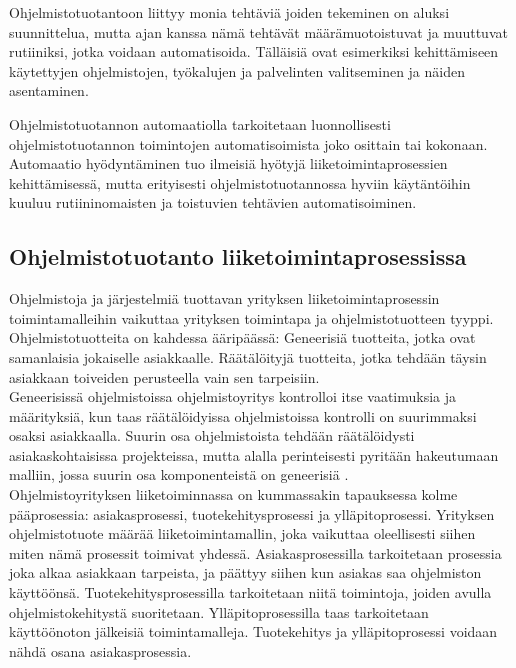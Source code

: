 \documentclass[finnish,12pt,a4paper,pdftex]{article}
\begin{document}
Ohjelmistotuotantoon liittyy monia tehtäviä joiden tekeminen on aluksi suunnittelua, mutta ajan kanssa nämä tehtävät määrämuotoistuvat ja muuttuvat rutiiniksi, jotka voidaan automatisoida. Tälläisiä ovat esimerkiksi kehittämiseen käytettyjen ohjelmistojen, työkalujen ja palvelinten valitseminen ja näiden asentaminen. \citep{kallio}

Ohjelmistotuotannon automaatiolla tarkoitetaan luonnollisesti ohjelmistotuotannon toimintojen automatisoimista joko osittain tai kokonaan. Automaatio hyödyntäminen tuo ilmeisiä hyötyjä liiketoimintaprosessien kehittämisessä, mutta erityisesti ohjelmistotuotannossa hyviin käytäntöihin kuuluu rutiininomaisten ja toistuvien tehtävien automatisoiminen. \citep{leanit}


\subsection{Ohjelmistotuotanto liiketoimintaprosessissa}

Ohjelmistoja ja järjestelmiä tuottavan yrityksen liiketoimintaprosessin toimintamalleihin vaikuttaa yrityksen toimintapa ja ohjelmistotuotteen tyyppi. Ohjelmistotuotteita on kahdessa ääripäässä: Geneerisiä tuotteita, jotka ovat samanlaisia jokaiselle asiakkaalle. Räätälöityjä tuotteita, jotka tehdään täysin asiakkaan toiveiden perusteella vain sen tarpeisiin. \citep{sommerville} \\

Geneerisissä ohjelmistoissa ohjelmistoyritys kontrolloi itse vaatimuksia ja määrityksiä, kun taas räätälöidyissa ohjelmistoissa kontrolli on suurimmaksi osaksi asiakkaalla. Suurin osa ohjelmistoista tehdään räätälöidysti asiakaskohtaisissa projekteissa, mutta alalla perinteisesti pyritään hakeutumaan malliin, jossa suurin osa komponenteistä on geneerisiä \citep{sommerville}.\\

Ohjelmistoyrityksen liiketoiminnassa on kummassakin tapauksessa kolme pääprosessia: asiakasprosessi, tuotekehitysprosessi ja ylläpitoprosessi. Yrityksen ohjelmistotuote määrää liiketoimintamallin, joka vaikuttaa oleellisesti siihen miten nämä prosessit toimivat yhdessä. Asiakasprosessilla tarkoitetaan prosessia joka alkaa asiakkaan tarpeista, ja päättyy siihen kun asiakas saa ohjelmiston käyttöönsä. Tuotekehitysprosessilla tarkoitetaan niitä toimintoja, joiden avulla ohjelmistokehitystä suoritetaan. Ylläpitoprosessilla taas tarkoitetaan käyttöönoton jälkeisiä toimintamalleja. Tuotekehitys ja ylläpitoprosessi voidaan nähdä osana asiakasprosessia. \citep{okaytannot}\\
\end{document}
